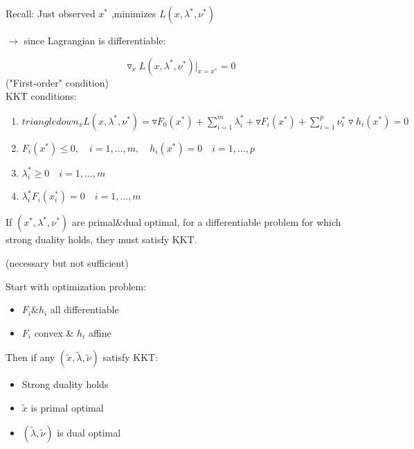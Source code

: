 Recall: Just observed $x^*$ ,minimizes $L(x,\lambda^*,\nu^*)$

$\rightarrow$ since Lagrangian is differentiable:

\begin{equation*}
\triangledown_x L(x,\lambda^*,\nu^*) {\vert}_{x=x^*} = 0
\end{equation*}
("First-order" condition)\\


KKT conditions:

\begin{enumerate}
	\item $triangledown_x L(x,\lambda^*,\nu^*) = \triangledown F_0(x^*)+\sum^m_{i=1}\lambda^*_i+\triangledown F_i(x^*)+\sum^p_{i=1}\nu_i^*\triangledown h_i(x^*)=0$
	
	\item $F_i(x^*) \leq 0,\quad i=1,...,m,\quad h_i(x^*)=0\quad i=1,...,p$
	
	\item $\lambda_i^*\geq 0\quad i=1,...,m$
	
	\item $\lambda_i^*F_i(x_i^*)= 0\quad i=1,...,m$
\end{enumerate}

\begin{theorem}{}
	If $(x^*,\lambda^*,\nu^*)$ are primal\&dual optimal, for a differentiable problem for which strong duality holds, they must satisfy KKT.
\end{theorem}
(necessary but not sufficient)

\begin{theorem}
	Start with optimization problem:
	\begin{itemize}
		\item $F_i\&h_i$ all differentiable
		
		\item $F_i$ convex \& $h_i$ affine
	\end{itemize}
	
	Then if any $(\tilde{x},\tilde{\lambda},\tilde{\nu})$ satisfy KKT:
	
	\begin{itemize}
		\item Strong duality holds
		
		\item $\tilde{x}$ is primal optimal
		
		\item $(\tilde{\lambda},\tilde{\nu})$ is dual optimal
	\end{itemize}
\end{theorem}

